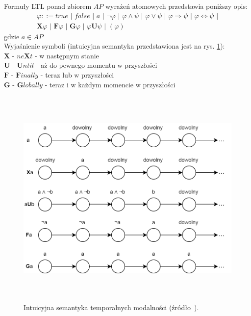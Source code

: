 Formuły LTL ponad zbiorem $AP$ wyrażeń atomowych przedstawia poniższy opis:
\begin{gather}
\varphi::= true \,\, | \,\, false \,\, | \,\, a \,\, | \,\, \neg\varphi \,\, | \,\, \varphi \land \psi \,\, | \,\, \varphi \lor \psi \,\, | \,\, \varphi \Rightarrow \psi \,\, | \,\, \varphi \Leftrightarrow \psi \,\, | \nonumber\\
\mathbf{X}\varphi \,\, | \,\, \mathbf{F}\varphi \,\, | \,\, \mathbf{G}\varphi \,\, | \,\, \varphi\mathbf{U}\psi \,\, | \,\, (\varphi)\nonumber
\end{gather}
gdzie $a \in AP$ \\
Wyjaśnienie symboli (intuicyjna semantyka przedstawiona jest na rys. \ref{fig:ltl_semantics}): \\
$\mathbf{X}$ - $ne\mathbf{X}t$ - w następnym stanie \\
$\mathbf{U}$ - $\mathbf{U}ntil$ - aż do pewnego momentu w przyszłości \\
$\mathbf{F}$ - $\mathbf{F}inally$ - teraz lub w przyszłości \\
$\mathbf{G}$ - $\mathbf{G}lobally$ - teraz i w każdym momencie w przyszłości
\vspace{0.5cm}

\begin{figure}[h]
    \centering
    \includegraphics[height=11cm,keepaspectratio]{img/ltl_intuitive_semantics.png}
    \caption{Intuicyjna semantyka temporalnych modalności (źródło~\cite{Bai08}).}
    \label{fig:ltl_semantics}
\end{figure}

